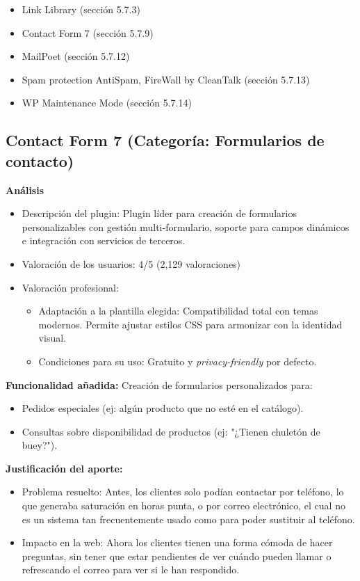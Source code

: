 \documentclass[a4paper]{article}
\begin{document}
\begin{itemize}
    \item Link Library (sección 5.7.3)
    \item Contact Form 7 (sección 5.7.9)
    \item MailPoet (sección 5.7.12)
    \item Spam protection AntiSpam, FireWall by CleanTalk (sección 5.7.13)
    \item WP Maintenance Mode (sección 5.7.14)
\end{itemize}


\subsection{Contact Form 7 (Categoría: Formularios de contacto)}

\textbf{Análisis}
\begin{itemize}
    \item Descripción del plugin: Plugin líder para creación de formularios personalizables con gestión multi-formulario, soporte para campos dinámicos e integración con servicios de terceros.
    \item Valoración de los usuarios: 4/5 (2,129 valoraciones)
    \item Valoración profesional:
    \begin{itemize}
        \item Adaptación a la plantilla elegida: Compatibilidad total con temas modernos. Permite ajustar estilos CSS para armonizar con la identidad visual.
        \item Condiciones para su uso: Gratuito y \textit{privacy-friendly} por defecto.
    \end{itemize}
\end{itemize}

\textbf{Funcionalidad añadida:} Creación de formularios personalizados para:
\begin{itemize}
    \item Pedidos especiales (ej: algún producto que no esté en el catálogo).
    \item Consultas sobre disponibilidad de productos (ej: "¿Tienen chuletón de buey?").
\end{itemize}


\textbf{Justificación del aporte:}
\begin{itemize}
    \item Problema resuelto: Antes, los clientes solo podían contactar por teléfono, lo que generaba saturación en horas punta, o por correo electrónico, el cual no es un sistema tan frecuentemente usado como para poder sustituir al teléfono.
    \item Impacto en la web: Ahora los clientes tienen una forma cómoda de hacer preguntas, sin tener que estar pendientes de ver cuándo pueden llamar o refrescando el correo para ver si le han respondido.
\end{itemize}
\end{document}
